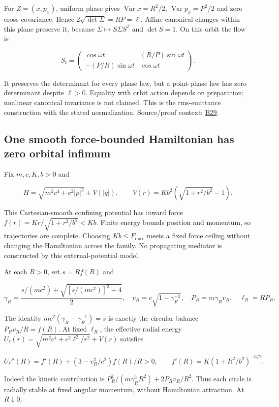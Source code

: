 \documentclass[11pt,a4paper]{article}
\begin{document}
For \(Z=(x,p_x)\), uniform phase gives \(\operatorname{Var}x=R^2/2\),
\(\operatorname{Var}p_x=P^2/2\) and zero cross covariance. Hence
\(2\sqrt{\det\Sigma}=RP=\ell\). Affine canonical changes within this
plane preserve it, because \(\Sigma\mapsto S\Sigma S^T\) and
\(\det S=1\). On this orbit the flow is

\[S_t=\begin{pmatrix}\cos\omega t&(R/P)\sin\omega t\\
-(P/R)\sin\omega t&\cos\omega t\end{pmatrix}.\]

It preserves the determinant for every phase law, but a point-phase law
has zero determinant despite \(\ell>0\). Equality with orbit action
depends on preparation; nonlinear canonical invariance is not claimed.
This is the rms-emittance construction with the stated normalization.
Source/proof context: \href{../references/batches/B29.md}{B29}.

\hypertarget{one-smooth-force-bounded-hamiltonian-has-zero-orbital-infimum}{%
\subsection{One smooth force-bounded Hamiltonian has zero orbital
infimum}\label{one-smooth-force-bounded-hamiltonian-has-zero-orbital-infimum}}

Fix \(m,c,K,b>0\) and

\[H=\sqrt{m^2c^4+c^2|p|^2}+V(|q|),\qquad
V(r)=Kb^2(\sqrt{1+r^2/b^2}-1).\]

This Cartesian-smooth confining potential has inward force
\(f(r)=Kr/\sqrt{1+r^2/b^2}<Kb\). Finite energy bounds position and
momentum, so trajectories are complete. Choosing \(Kb\le F_{\max}\)
meets a fixed force ceiling without changing the Hamiltonian across the
family. No propagating mediator is constructed by this
external-potential model.

At each \(R>0\), set \(s=Rf(R)\) and

\[\gamma_R=\frac{s/(mc^2)+\sqrt{[s/(mc^2)]^2+4}}2,\quad
v_R=c\sqrt{1-\gamma_R^{-2}},\quad P_R=m\gamma_Rv_R,\quad \ell_R=RP_R.\]

The identity \(mc^2(\gamma_R-\gamma_R^{-1})=s\) is exactly the circular
balance \(P_Rv_R/R=f(R)\). At fixed \(\ell_R\), the effective radial
energy \(U_\ell(r)=\sqrt{m^2c^4+c^2\ell^2/r^2}+V(r)\) satisfies

\[U_\ell''(R)=f'(R)+(3-v_R^2/c^2)f(R)/R>0,\qquad
f'(R)=K(1+R^2/b^2)^{-3/2}.\]

Indeed the kinetic contribution is
\(P_R^2/(m\gamma_R^3R^2)+2P_Rv_R/R^2\). Thus each circle is radially
stable at fixed angular momentum, without Hamiltonian attraction. At
\(R\downarrow0\),
\end{document}
